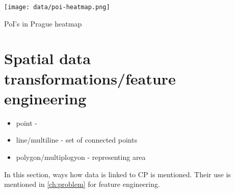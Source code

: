 \begin{marginfigure}
    \texttt{[image: data/poi-heatmap.png]}
    \caption{}{PoI's in Prague heatmap}
\end{marginfigure}




\section{Spatial data transformations/feature engineering}
\label{sec:spatial-transformations}

\begin{kaobox}[frametitle=Spatial data types]

    \begin{itemize}
        \item{point} -
        \item{line/multiline} - set of connected points
        \item{polygon/multiplogyon} - representing area
    \end{itemize}
\end{kaobox}

In this section, ways how data is linked to \acrlong{CP} is mentioned. Their use is mentioned in \ref{ch:problem} for feature engineering.

